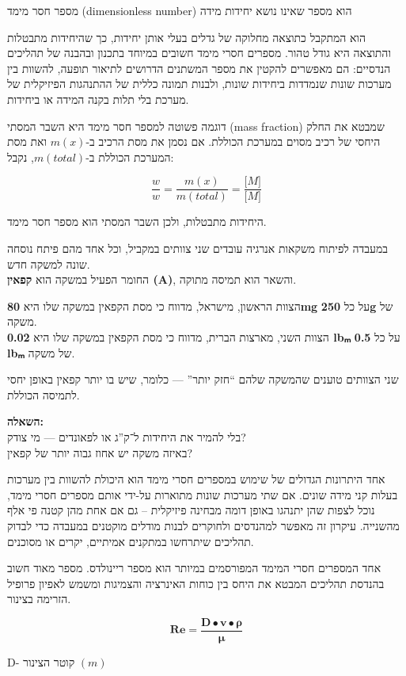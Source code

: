 \documentclass[
  hebrew,
  letterpaper,
  DIV=11,
  numbers=noendperiod]{scrreprt}
\begin{document}
{מספר חסר מימד} (dimensionless number) {הוא מספר שאינו נושא יחידות מידה}

{הוא המתקבל כתוצאה מחלוקה של גדלים בעלי אותן יחידות, כך שהיחידות מתבטלות
והתוצאה היא גודל טהור. מספרים חסרי מימד חשובים במיוחד בתכנון ובהבנה של
תהליכים הנדסיים: הם מאפשרים להקטין את מספר המשתנים הדרושים לתיאור תופעה,
להשוות בין מערכות שונות שנמדדות ביחידות שונות, ולבנות תמונה כללית של
ההתנהגות הפיזיקלית של מערכת בלי תלות בקנה המידה או ביחידות}.

{דוגמה פשוטה למספר חסר מימד היא השבר המסתי (}mass fraction{) שמבטא את
החלק היחסי של רכיב מסוים במערכת הכוללת. אם נסמן את מסת הרכיב ב}-\(m(x)\)
{ואת מסת המערכת הכוללת ב}-\(m(total)\), {נקבל}:

\[\frac{w}{w} = \frac{m(x)}{m(total)} = \frac{\lbrack M\rbrack}{\lbrack M\rbrack}\]

{היחידות מתבטלות, ולכן השבר המסתי הוא מספר חסר מימד}.

במעבדה לפיתוח משקאות אנרגיה עובדים שני צוותים במקביל, וכל אחד מהם פיתח
נוסחה שונה למשקה חדש.\\
החומר הפעיל במשקה הוא \textbf{קפאין (A)}, והשאר הוא תמיסה מתוקה.

הצוות הראשון, מישראל, מדווח כי מסת הקפאין במשקה שלו היא \textbf{80mg} על
כל \textbf{250g} של משקה.\\
הצוות השני, מארצות הברית, מדווח כי מסת הקפאין במשקה שלו היא \textbf{0.02
lbₘ} על כל \textbf{0.5 lbₘ} של משקה.

שני הצוותים טוענים שהמשקה שלהם ``חזק יותר'' --- כלומר, שיש בו יותר קפאין
באופן יחסי לתמיסה הכוללת.

\textbf{השאלה:}\\
בלי להמיר את היחידות ל־ק''ג או לפאונדים --- מי צודק?\\
באיזה משקה יש אחוז גבוה יותר של קפאין?

{אחד היתרונות הגדולים של שימוש במספרים חסרי מימד הוא היכולת להשוות בין
מערכות בעלות קני מידה שונים}. {אם שתי מערכות שונות מתוארות על-ידי אותם
מספרים חסרי מימד, נוכל לצפות שהן יתנהגו באופן דומה מבחינה פיזיקלית -- גם
אם אחת מהן קטנה פי אלף מהשנייה. עיקרון זה מאפשר למהנדסים ולחוקרים לבנות
מודלים מוקטנים במעבדה כדי לבדוק תהליכים שיתרחשו במתקנים אמיתיים, יקרים
או מסוכנים}.

{אחד המספרים חסרי המימד המפורסמים במיותר הוא מספר ריינולדס. מספר מאוד
חשוב בהנדסת תהליכים המבטא את היחס בין כוחות האינרציה והצמיגות ומשמש
לאפיון פרופיל הזרימה בצינור.}

\[\mathbf{Re =}\frac{\mathbf{D \bullet v \bullet \rho}}{\mathbf{\mu}}\]

D{- קוטר הצינור} \((m)\)
\end{document}
